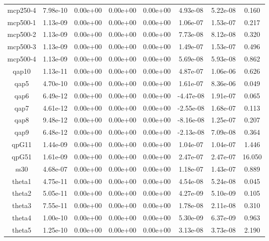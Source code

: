 {{\begin{table}[h]
\begin{center}
{\begin{tabular}{cccccccc}
            mcp250-4 & 7.98e-10 & 0.00e+00 & 0.00e+00 & 0.00e+00 & 4.93e-08 & 5.22e-08 & 0.160 \\ 
            mcp500-1 & 1.13e-09 & 0.00e+00 & 0.00e+00 & 0.00e+00 & 1.06e-07 & 1.53e-07 & 0.217 \\ 
            mcp500-2 & 1.13e-09 & 0.00e+00 & 0.00e+00 & 0.00e+00 & 7.73e-08 & 8.12e-08 & 0.320 \\ 
            mcp500-3 & 1.13e-09 & 0.00e+00 & 0.00e+00 & 0.00e+00 & 1.49e-07 & 1.53e-07 & 0.496 \\ 
            mcp500-4 & 1.13e-09 & 0.00e+00 & 0.00e+00 & 0.00e+00 & 5.69e-08 & 5.93e-08 & 0.862 \\ 
               qap10 & 1.13e-11 & 0.00e+00 & 0.00e+00 & 0.00e+00 & 4.87e-07 & 1.06e-06 & 0.626 \\ 
                qap5 & 4.70e-10 & 0.00e+00 & 0.00e+00 & 0.00e+00 & 1.61e-07 & 8.36e-06 & 0.049 \\ 
                qap6 & 6.49e-12 & 0.00e+00 & 0.00e+00 & 0.00e+00 & -4.47e-08 & 1.91e-07 & 0.065 \\ 
                qap7 & 4.61e-12 & 0.00e+00 & 0.00e+00 & 0.00e+00 & -2.55e-08 & 1.68e-07 & 0.113 \\ 
                qap8 & 9.48e-12 & 0.00e+00 & 0.00e+00 & 0.00e+00 & -8.16e-08 & 1.25e-07 & 0.207 \\ 
                qap9 & 6.48e-12 & 0.00e+00 & 0.00e+00 & 0.00e+00 & -2.13e-08 & 7.09e-08 & 0.364 \\ 
               qpG11 & 1.44e-09 & 0.00e+00 & 0.00e+00 & 0.00e+00 & 1.04e-07 & 1.04e-07 & 1.446 \\ 
               qpG51 & 1.61e-09 & 0.00e+00 & 0.00e+00 & 0.00e+00 & 2.47e-07 & 2.47e-07 & 16.050 \\ 
                ss30 & 4.68e-07 & 0.00e+00 & 0.00e+00 & 0.00e+00 & 1.18e-07 & 1.43e-07 & 0.889 \\ 
              theta1 & 4.75e-11 & 0.00e+00 & 0.00e+00 & 0.00e+00 & 4.54e-08 & 5.24e-08 & 0.045 \\ 
              theta2 & 5.05e-11 & 0.00e+00 & 0.00e+00 & 0.00e+00 & 4.27e-09 & 5.10e-09 & 0.105 \\ 
              theta3 & 7.55e-11 & 0.00e+00 & 0.00e+00 & 0.00e+00 & 1.78e-08 & 2.11e-08 & 0.310 \\ 
              theta4 & 1.00e-10 & 0.00e+00 & 0.00e+00 & 0.00e+00 & 5.30e-09 & 6.37e-09 & 0.963 \\ 
              theta5 & 1.25e-10 & 0.00e+00 & 0.00e+00 & 0.00e+00 & 3.13e-08 & 3.73e-08 & 2.190 \\ 

\end{tabular}}
\end{center}
\end{table}}}
